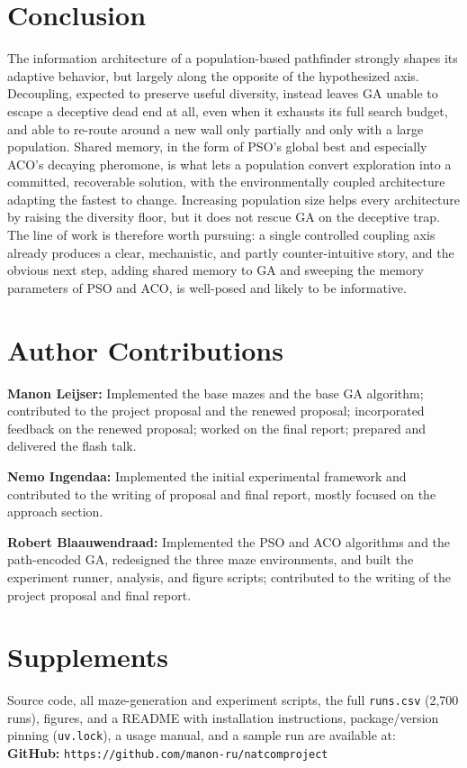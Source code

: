 \documentclass[11pt,a4paper]{article}
\begin{document}
    \section{Conclusion}
    The information architecture of a population-based pathfinder strongly shapes its adaptive behavior, but largely along the opposite of the hypothesized axis. Decoupling, expected to preserve useful diversity, instead leaves GA unable to escape a deceptive dead end at all, even when it exhausts its full search budget, and able to re-route around a new wall only partially and only with a large population. Shared memory, in the form of PSO's global best and especially ACO's decaying pheromone, is what lets a population convert exploration into a committed, recoverable solution, with the environmentally coupled architecture adapting the fastest to change. Increasing population size helps every architecture by raising the diversity floor, but it does not rescue GA on the deceptive trap. The line of work is therefore worth pursuing: a single controlled coupling axis already produces a clear, mechanistic, and partly counter-intuitive story, and the obvious next step, adding shared memory to GA and sweeping the memory parameters of PSO and ACO, is well-posed and likely to be informative.

    \newpage

    \section*{Author Contributions}
    \noindent\textbf{Manon Leijser:} Implemented the base mazes and the base GA algorithm; contributed to the project proposal and the renewed proposal; incorporated feedback on the renewed proposal; worked on the final report; prepared and delivered the flash talk.

    \noindent\textbf{Nemo Ingendaa:} Implemented the initial experimental framework and contributed to the writing of proposal and final report, mostly focused on the approach section.

    \noindent\textbf{Robert Blaauwendraad:} Implemented the PSO and ACO algorithms and the path-encoded GA, redesigned the three maze environments, and built the experiment runner, analysis, and figure scripts; contributed to the writing of the project proposal and final report.

    \section*{Supplements}
    Source code, all maze-generation and experiment scripts, the full \texttt{runs.csv} (2{,}700 runs), figures, and a README with installation instructions, package/version pinning (\texttt{uv.lock}), a usage manual, and a sample run are available at:\\
    \textbf{GitHub:} \texttt{https://github.com/manon-ru/natcomproject}
\end{document}
